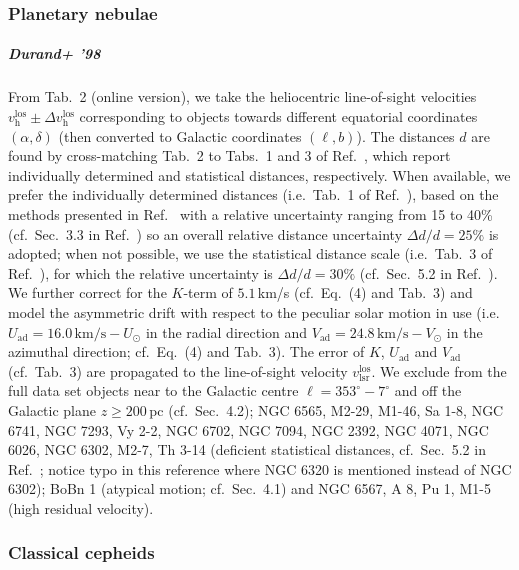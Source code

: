 \documentclass[twocolumn,prd,reprint,preprintnumbers,amsmath,amssymb,superscriptaddress,nofootinbib]{revtex4}
\begin{document}
\subsubsection{Planetary nebulae}

\subparagraph{Durand+ '98 \cite{Durand1998}} From Tab.~2 (online version), we take the heliocentric line-of-sight velocities $v_{\textrm{h}}^{\textrm{los}}\pm \Delta v_{\textrm{h}}^{\textrm{los}}$ corresponding to objects towards different equatorial coordinates $(\alpha,\delta)$ (then converted to Galactic coordinates $(\ell,b)$). The distances $d$ are found by cross-matching Tab.~2 to Tabs.~1 and 3 of Ref.~\cite{Zhang1995}, which report individually determined and statistical distances, respectively. When available, we prefer the individually determined distances (i.e.~Tab.~1 of Ref.~\cite{Zhang1995}), based on the methods presented in Ref.~\cite{Zhang1993} with a relative uncertainty ranging from 15 to 40\% (cf.~Sec.~3.3 in Ref.~\cite{Zhang1993}) so an overall relative distance uncertainty $\Delta d/d=25\%$ is adopted; when not possible, we use the statistical distance scale (i.e.~Tab.~3 of Ref.~\cite{Zhang1995}), for which the relative uncertainty is $\Delta d/d=30\%$ (cf.~Sec.~5.2 in Ref.~\cite{Zhang1995}). We further correct for the $K$-term of $5.1\,$km/s (cf.~Eq.~(4) and Tab.~3) and model the asymmetric drift with respect to the peculiar solar motion in use (i.e.~$U_{\textrm{ad}}=16.0\,\textrm{km/s}-U_\odot$ in the radial direction and $V_{\textrm{ad}}=24.8\,\textrm{km/s}-V_\odot$ in the azimuthal direction; cf.~Eq.~(4) and Tab.~3). The error of $K$, $U_{\textrm{ad}}$ and $V_{\textrm{ad}}$ (cf.~Tab.~3) are propagated to the line-of-sight velocity $v_{\textrm{lsr}}^{\textrm{los}}$. We exclude from the full data set objects near to the Galactic centre $\ell=353^{\circ}-7^{\circ}$ and off the Galactic plane $z\geq 200\,$pc (cf.~Sec.~4.2); NGC 6565, M2-29, M1-46, Sa 1-8, NGC 6741, NGC 7293, Vy 2-2, NGC 6702, NGC 7094, NGC 2392, NGC 4071, NGC 6026, NGC 6302, M2-7, Th 3-14 (deficient statistical distances, cf.~Sec.~5.2 in Ref.~\cite{Zhang1995}; notice typo in this reference where NGC 6320 is mentioned instead of NGC 6302); BoBn 1 (atypical motion; cf.~Sec.~4.1) and NGC 6567, A 8, Pu 1, M1-5 (high residual velocity).


\subsubsection{Classical cepheids}
\end{document}

